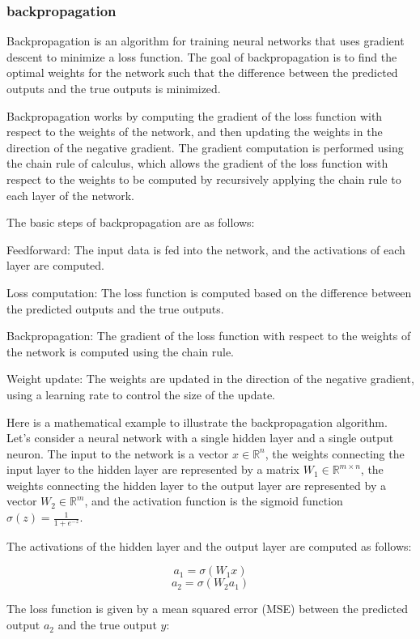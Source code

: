 \documentclass[12pt, a4paper, oneside]{article}
\begin{document}
\subsubsection{backpropagation}
Backpropagation is an algorithm for training neural networks that uses gradient descent to minimize a loss function. The goal of backpropagation is to find the optimal weights for the network such that the difference between the predicted outputs and the true outputs is minimized.

Backpropagation works by computing the gradient of the loss function with respect to the weights of the network, and then updating the weights in the direction of the negative gradient. The gradient computation is performed using the chain rule of calculus, which allows the gradient of the loss function with respect to the weights to be computed by recursively applying the chain rule to each layer of the network.

The basic steps of backpropagation are as follows:

Feedforward: The input data is fed into the network, and the activations of each layer are computed.

Loss computation: The loss function is computed based on the difference between the predicted outputs and the true outputs.

Backpropagation: The gradient of the loss function with respect to the weights of the network is computed using the chain rule.

Weight update: The weights are updated in the direction of the negative gradient, using a learning rate to control the size of the update.

Here is a mathematical example to illustrate the backpropagation algorithm. Let's consider a neural network with a single hidden layer and a single output neuron. The input to the network is a vector $x \in \mathbb{R}^n$, the weights connecting the input layer to the hidden layer are represented by a matrix $W_1 \in \mathbb{R}^{m \times n}$, the weights connecting the hidden layer to the output layer are represented by a vector $W_2 \in \mathbb{R}^m$, and the activation function is the sigmoid function $\sigma(z) = \frac{1}{1 + e^{-z}}$.

The activations of the hidden layer and the output layer are computed as follows:

$$ a_1 = \sigma(W_1x) $$
$$ a_2 = \sigma(W_2a_1) $$

The loss function is given by a mean squared error (MSE) between the predicted output $a_2$ and the true output $y$:
\end{document}
